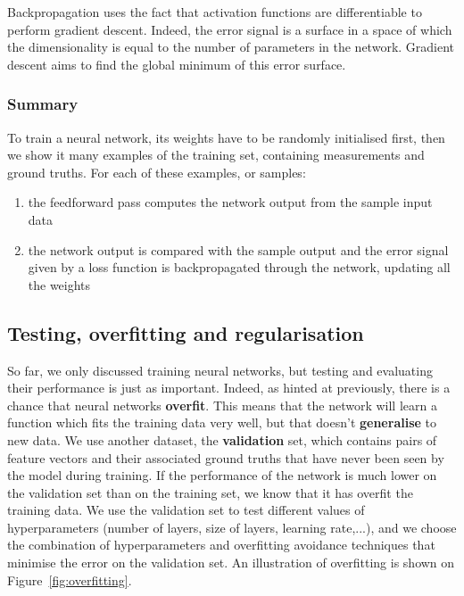 Backpropagation uses the fact that activation functions are differentiable to
perform gradient descent. Indeed, the error signal is a surface in a space
of which the dimensionality is equal to the number of parameters in the
network. Gradient descent aims to find the global minimum of this error
surface.\\


\subsubsection{Summary}
To train a neural network, its weights have to be randomly initialised first,
then we show it many examples of the training set, containing measurements and
ground truths. For each of these examples, or samples:
\begin{enumerate}
	\item the feedforward pass computes the network output from the sample
		input data
	\item the network output is compared with the sample output and the
		error signal given by a loss function
		is backpropagated through the network, updating
		all the weights
\end{enumerate}

\subsection{Testing, overfitting and regularisation}
\label{sec:regularisation}
So far, we only discussed training neural networks, but testing and
evaluating their performance is just as important. Indeed, as hinted at
previously, there is a chance that neural networks \textbf{overfit}. This
means that the network will learn a function which fits the training data
very well, but that doesn't \textbf{generalise} to new data. We use
another dataset, the \textbf{validation} set, which contains pairs of feature
vectors and their associated ground truths that have never been seen by the
model during training. If the performance of the network is much lower on
the validation set than on the training set, we know that it has overfit
the training data. We use the validation set to test different 
values of hyperparameters (number of layers, size of layers, learning rate,...),
and we choose the combination of hyperparameters and overfitting avoidance
techniques that minimise the error on the validation set. An illustration
of overfitting is shown on Figure~\ref{fig:overfitting}.\\

